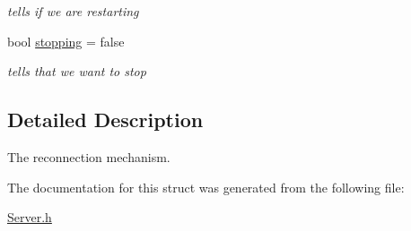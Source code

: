 \begin{DoxyCompactItemize}
\begin{DoxyCompactList}\small\item\em tells if we are restarting \end{DoxyCompactList}\item 
\hypertarget{a00053_aab65ea7522565504db68def2dcb489f7}{bool \hyperlink{a00053_aab65ea7522565504db68def2dcb489f7}{stopping} = false}\label{a00053_aab65ea7522565504db68def2dcb489f7}

\begin{DoxyCompactList}\small\item\em tells that we want to stop \end{DoxyCompactList}\end{DoxyCompactItemize}


\subsection{Detailed Description}
The reconnection mechanism. 

The documentation for this struct was generated from the following file\-:\begin{DoxyCompactItemize}
\item 
\hyperlink{a00125}{Server.\-h}\end{DoxyCompactItemize}
